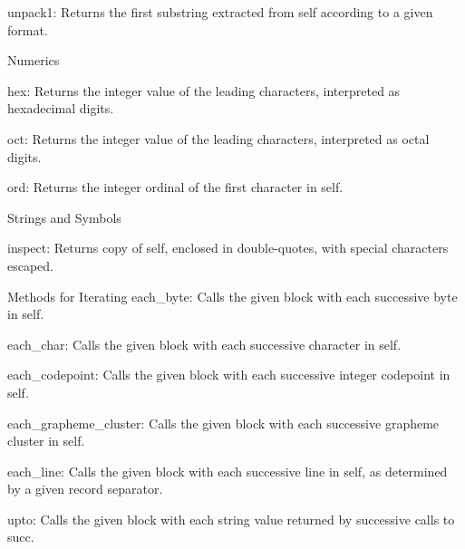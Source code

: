unpack1: Returns the first substring extracted from self according to a given format.

Numerics

hex: Returns the integer value of the leading characters, interpreted as hexadecimal digits.

oct: Returns the integer value of the leading characters, interpreted as octal digits.

ord: Returns the integer ordinal of the first character in self.



Strings and Symbols

inspect: Returns copy of self, enclosed in double-quotes, with special characters escaped.





Methods for Iterating
each\_byte: Calls the given block with each successive byte in self.

each\_char: Calls the given block with each successive character in self.

each\_codepoint: Calls the given block with each successive integer codepoint in self.

each\_grapheme\_cluster: Calls the given block with each successive grapheme cluster in self.

each\_line: Calls the given block with each successive line in self, as determined by a given record separator.

upto: Calls the given block with each string value returned by successive calls to succ.



